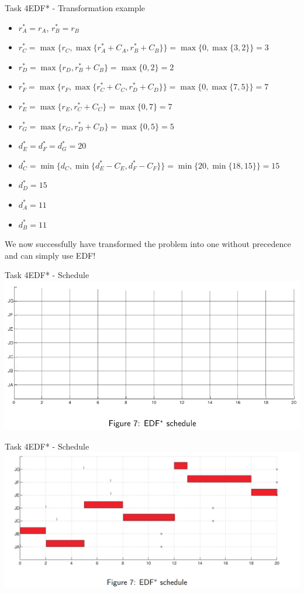 \begin{frame}[allowframebreaks]{Task 4}{EDF* - Transformation example}
    \begin{itemize}
        \item $r_A^* = r_A$, $r_B^* = r_B$
        \item $r_C^* = \max\{r_C,\max\{r_A^* + C_A, r_B^* + C_B\}\} = \max\{0, \max\{3, 2\}\} = 3$
        \item $r_D^* = \max\{r_D,r_B^* + C_B\} = \max\{0, 2\} = 2$
        \item $r_F^* = \max\{r_F,\max\{r_C^* + C_C, r_D^* + C_D\}\} = \max\{0, \max\{7, 5\}\} = 7$
        \item $r_E^* = \max\{r_E,r_C^* + C_C\} = \max\{0, 7\} = 7$
        \item $r_G^* = \max\{r_G,r_D^* + C_D\} = \max\{0, 5\} = 5$
    \end{itemize}
    \framebreak
    \begin{itemize}
        \item $d_E^* = d_F^* = d_G^* = 20$
        \item $d_C^* = \min\{d_C, \min\{d_E^* - C_E, d_F^* - C_F\}\} = \min\{20, \min\{18, 15\}\} = 15$
        \item $d_D^* = 15$
        \item $d_A^* = 11$
        \item $d_B^* = 11$
    \end{itemize}
    We now successfully have transformed the problem into one without precedence and can simply use EDF!
\end{frame}
\begin{frame}{Task 4}{EDF* - Schedule}
    \includegraphics[width = 0.9\linewidth]{figures/EDF-star-schedule.png}
\end{frame}

\begin{frame}{Task 4}{EDF* - Schedule}
    \includegraphics[width = \linewidth]{figures/edf-star-schedule-2.PNG}
\end{frame}

